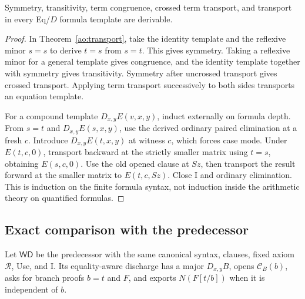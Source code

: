 \begin{corollary}
\label{ao:full-equality}
Symmetry, transitivity, term congruence, crossed term transport, and
transport in every Eq/$D$ formula template are derivable.
\end{corollary}
\begin{proof}
In Theorem~\ref{ao:transport}, take the identity template and the
reflexive minor $s=s$ to derive $t=s$ from $s=t$.  This gives symmetry.
Taking a reflexive minor for a general template gives congruence, and
the identity template together with symmetry gives transitivity.
Symmetry after uncrossed transport gives crossed transport.  Applying
term transport successively to both sides transports an equation template.

For a compound template $D_{x,y}E(v,x,y)$, induct externally on formula
depth.  From $s=t$ and $D_{x,y}E(s,x,y)$, use the derived ordinary
paired elimination at a fresh $c$.  Introduce $D_{x,y}E(t,x,y)$ at
witness $c$, which forces case mode.  Under $E(t,c,0)$, transport
backward at the strictly smaller matrix using $t=s$, obtaining
$E(s,c,0)$.  Use the old opened clause at $Sz$, then transport the
result forward at the smaller matrix to $E(t,c,Sz)$.  Close I and
ordinary elimination.  This is induction on the finite formula syntax,
not induction inside the arithmetic theory on quantified formulas.
\end{proof}

\subsection{Exact comparison with the predecessor}

Let $\mathsf{WD}$ be the predecessor with the same canonical syntax,
clauses, fixed axiom $\mathcal R$, Use, and I.  Its equality-aware
discharge has a major $D_{x,y}B$, opens $\mathcal C_B(b)$, asks for
branch proofs $b=t$ and $F$, and exports $N(F[t/b])$ when it is
independent of $b$.


